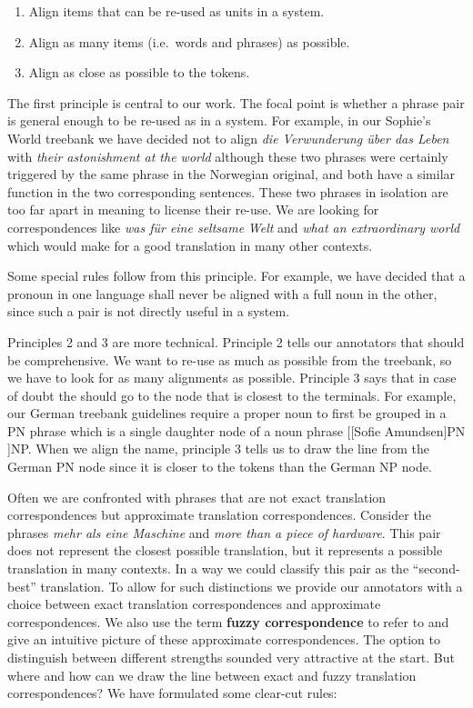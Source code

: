 \documentclass[output=paper]{LSP/langsci}
\begin{document}
\begin{enumerate}
\item Align items that can be re-used as units in a  system. 
\item Align as many items (i.e.~words and phrases) as possible. 
\item Align as close as possible to the tokens.
\end{enumerate} 

The first principle is central to our work. The focal point is whether a phrase pair is general enough to be re-used as  in a  system. For example, in our Sophie's World treebank we have decided not to align \textit{die Verwunderung über das Leben} with \textit{their astonishment at the world} although these two phrases were certainly triggered by the same phrase in the Norwegian original, and both have a similar function in the two corresponding sentences. These two phrases in isolation are too far apart in meaning to license their re-use. We are looking for correspondences like \textit{was für eine seltsame} \textit{Welt }and \textit{what an extraordinary world }which would make for a good translation in many other contexts. 

Some special rules follow from this principle. For example, we have decided that a pronoun in one language shall never be aligned with a full noun in the other, since such a pair is not directly useful in a  system. 

\newpage 
Principles 2 and 3 are more technical. Principle 2 tells our annotators that  should be comprehensive. We want to re-use as much as possible from the treebank, so we have to look for as many alignments as possible. Principle 3 says that in case of doubt the  should go to the node that is closest to the terminals. For example, our German treebank guidelines require a  proper noun to first be grouped in a PN phrase which is a single daughter node of a noun phrase [[Sofie Amundsen]PN ]NP. When we align the name, principle 3 tells us to draw the  line from the German PN node since it is closer to the tokens than the German NP node. 

Often we are confronted with phrases that are not exact translation correspondences but approximate translation correspondences. Consider the phrases \textit{mehr als eine Maschine} and \textit{more than a piece of hardware}. This pair does not represent the closest possible translation, but it represents a possible translation in many contexts. In a way we could classify this pair as the ``second-best'' translation. To allow for such distinctions we provide our annotators with a choice between exact translation correspondences and approximate correspondences. We also use the term \textbf{fuzzy correspondence} to refer to and give an intuitive picture of these approximate correspondences. The option to distinguish between different  strengths sounded very attractive at the start. But where and how can we draw the line between exact and fuzzy translation correspondences? We have formulated some clear-cut rules: 
\end{document}
